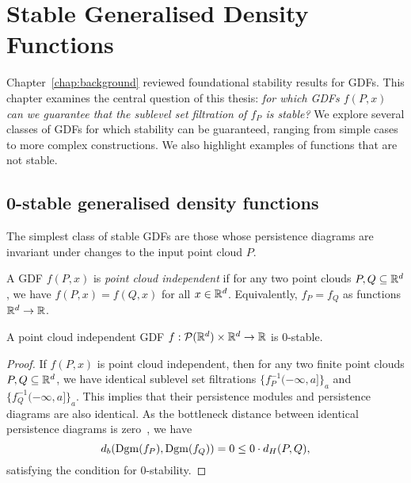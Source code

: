\chapter{Stable Generalised Density Functions}
\label{chap:stable_functions}

Chapter~\ref{chap:background} reviewed foundational stability results for GDFs.
This chapter examines the central question of this thesis: \emph{for which GDFs
$f(P, x)$ can we guarantee that the sublevel set filtration of $f_P$ is stable?}
We explore several classes of GDFs for which stability can be guaranteed,
ranging from simple cases to more complex constructions. We also highlight
examples of functions that are not stable.

\section{0-stable generalised density functions}

The simplest class of stable GDFs are those whose persistence diagrams are
invariant under changes to the input point cloud $P$.
\begin{definition}
    A GDF $f(P, x)$ is \emph{point cloud independent} if for any two point
    clouds $P, Q \subseteq \mathbb{R}^d$, we have $f(P, x) = f(Q, x)$ for all
    $x \in \mathbb{R}^d$. Equivalently, $f_P = f_Q$ as functions $\mathbb{R}^d \to \mathbb{R}$.
\end{definition}
\begin{theorem}
    \label{thm:independent_stable}
    A point cloud independent GDF $f : \mathcal{P}(\mathbb{R}^d) \times \mathbb{R}^d \to \mathbb{R}$
    is $0$-stable.
\end{theorem}
\begin{proof}
    If $f(P, x)$ is point cloud independent, then for any two finite point clouds
    $P, Q \subseteq \mathbb{R}^d$, we have identical sublevel set filtrations
    $\{f_P^{-1}(-\infty, a]\}_a$ and $\{f_Q^{-1}(-\infty, a]\}_a$.
    This implies that their persistence modules and persistence diagrams are
    also identical. As the bottleneck distance between identical persistence
    diagrams is zero~\cite{edelsbrunner2010computational}, we have
    \begin{equation}
        d_b(\operatorname{Dgm}(f_P), \operatorname{Dgm}(f_Q)) = 0 \leq 0 \cdot d_H(P, Q),
    \end{equation}
    satisfying the condition for $0$-stability.
\end{proof}

